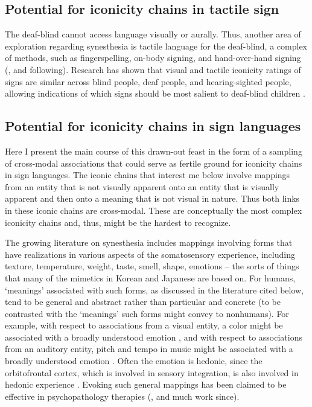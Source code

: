 \documentclass[output=paper,
modfonts
]{LSP/langsci}
\begin{document}
\subsection{Potential for iconicity chains in tactile sign}

The deaf-blind cannot access language visually or aurally. Thus, another
area of exploration regarding synesthesia is tactile language for the
deaf-blind, a complex of methods, such as fingerspelling, on-body
signing, and hand-over-hand signing (\citealt{edwards2012}, and following).
Research has shown that visual and tactile iconicity ratings of signs
are similar across blind people, deaf people, and hearing-sighted
people, allowing indications of which signs should be most salient to
deaf-blind children \citep{griffith1983}.

\subsection{Potential for iconicity chains in sign languages}

Here I present the main course of this drawn-out feast in the form of a
sampling of cross-modal associations that could serve as fertile ground
for iconicity chains in sign languages. The iconic chains that interest
me below involve mappings from an entity that is not visually apparent
onto an entity that is visually apparent and then onto a meaning that is
not visual in nature. Thus both links in these iconic chains are
cross-modal. These are conceptually the most complex iconicity chains
and, thus, might be the hardest to recognize.

The growing literature on synesthesia includes mappings involving forms
that have realizations in various aspects of the somatosensory
experience, including texture, temperature, weight, taste, smell, shape,
emotions -- the sorts of things that many of the mimetics in Korean and
Japanese are based on. For humans, `meanings' associated with such
forms, as discussed in the literature cited below, tend to be general
and abstract rather than particular and concrete (to be contrasted with
the `meanings' such forms might convey to nonhumans). For example, with
respect to associations from a visual entity, a color might be
associated with a broadly understood emotion \citep{johnson1986}, and with respect to associations from an auditory entity,
pitch and tempo in music might be associated with a broadly understood
emotion \citep{hevner1937,brower2000}. Often the emotion is hedonic, since
the orbitofrontal cortex, which is involved in sensory integration, is
also involved in hedonic experience \citep{kringelbach2005}. Evoking such
general mappings has been claimed to be effective in psychopathology
therapies (\citealt{lang1979}, and much work since).
\end{document}
